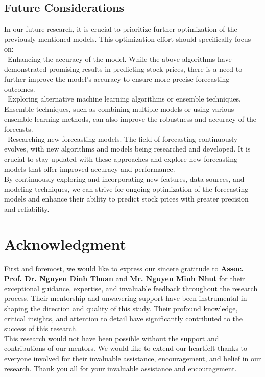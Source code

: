 \documentclass{ieeeojies}
\begin{document}
\subsection{Future Considerations}
In our future research, it is crucial to prioritize further optimization of the previously mentioned models. This optimization effort should specifically focus on:\\
\indent\textbullet\ Enhancing the accuracy of the model. While the above algorithms have demonstrated promising results in predicting stock prices, there is a need to further improve the model's accuracy to ensure more precise forecasting outcomes.\\
\indent\textbullet\ Exploring alternative machine learning algorithms or ensemble techniques. Ensemble techniques, such as combining multiple models or using various ensemble learning methods, can also improve the robustness and accuracy of the forecasts.\\
\indent\textbullet\ Researching new forecasting models. The field of forecasting continuously evolves, with new algorithms and models being researched and developed. It is crucial to stay updated with these approaches and explore new forecasting models that offer improved accuracy and performance. \\
By continuously exploring and incorporating new features, data sources, and modeling techniques, we can strive for ongoing optimization of the forecasting models and enhance their ability to predict stock prices with greater precision and reliability.
\section*{Acknowledgment}
First and foremost, we would like to express our sincere gratitude to \textbf{Assoc. Prof. Dr. Nguyen Dinh Thuan} and \textbf{Mr. Nguyen Minh Nhut} for their exceptional guidance, expertise, and invaluable feedback throughout the research process. Their mentorship and unwavering support have been instrumental in shaping the direction and quality of this study. Their profound knowledge, critical insights, and attention to detail have significantly contributed to the success of this research.
\\This research would not have been possible without the support and contributions of our mentors. We would like to extend our heartfelt thanks to everyone involved for their invaluable assistance, encouragement, and belief in our research. Thank you all for your invaluable assistance and encouragement.
\end{document}
